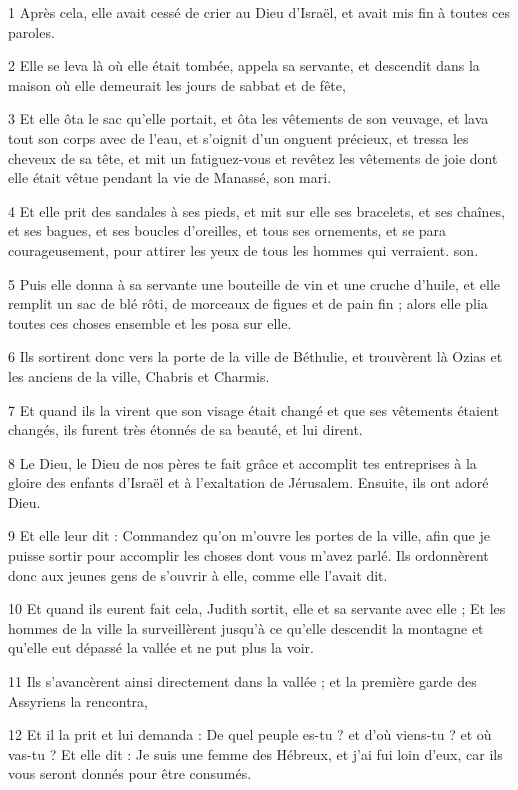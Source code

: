 \par 1 Après cela, elle avait cessé de crier au Dieu d'Israël, et avait mis fin à toutes ces paroles.
\par 2 Elle se leva là où elle était tombée, appela sa servante, et descendit dans la maison où elle demeurait les jours de sabbat et de fête,
\par 3 Et elle ôta le sac qu'elle portait, et ôta les vêtements de son veuvage, et lava tout son corps avec de l'eau, et s'oignit d'un onguent précieux, et tressa les cheveux de sa tête, et mit un fatiguez-vous et revêtez les vêtements de joie dont elle était vêtue pendant la vie de Manassé, son mari.
\par 4 Et elle prit des sandales à ses pieds, et mit sur elle ses bracelets, et ses chaînes, et ses bagues, et ses boucles d'oreilles, et tous ses ornements, et se para courageusement, pour attirer les yeux de tous les hommes qui verraient. son.
\par 5 Puis elle donna à sa servante une bouteille de vin et une cruche d'huile, et elle remplit un sac de blé rôti, de morceaux de figues et de pain fin ; alors elle plia toutes ces choses ensemble et les posa sur elle.
\par 6 Ils sortirent donc vers la porte de la ville de Béthulie, et trouvèrent là Ozias et les anciens de la ville, Chabris et Charmis.
\par 7 Et quand ils la virent que son visage était changé et que ses vêtements étaient changés, ils furent très étonnés de sa beauté, et lui dirent.
\par 8 Le Dieu, le Dieu de nos pères te fait grâce et accomplit tes entreprises à la gloire des enfants d'Israël et à l'exaltation de Jérusalem. Ensuite, ils ont adoré Dieu.
\par 9 Et elle leur dit : Commandez qu'on m'ouvre les portes de la ville, afin que je puisse sortir pour accomplir les choses dont vous m'avez parlé. Ils ordonnèrent donc aux jeunes gens de s'ouvrir à elle, comme elle l'avait dit.
\par 10 Et quand ils eurent fait cela, Judith sortit, elle et sa servante avec elle ; Et les hommes de la ville la surveillèrent jusqu'à ce qu'elle descendit la montagne et qu'elle eut dépassé la vallée et ne put plus la voir.
\par 11 Ils s'avancèrent ainsi directement dans la vallée ; et la première garde des Assyriens la rencontra,
\par 12 Et il la prit et lui demanda : De quel peuple es-tu ? et d'où viens-tu ? et où vas-tu ? Et elle dit : Je suis une femme des Hébreux, et j'ai fui loin d'eux, car ils vous seront donnés pour être consumés.
